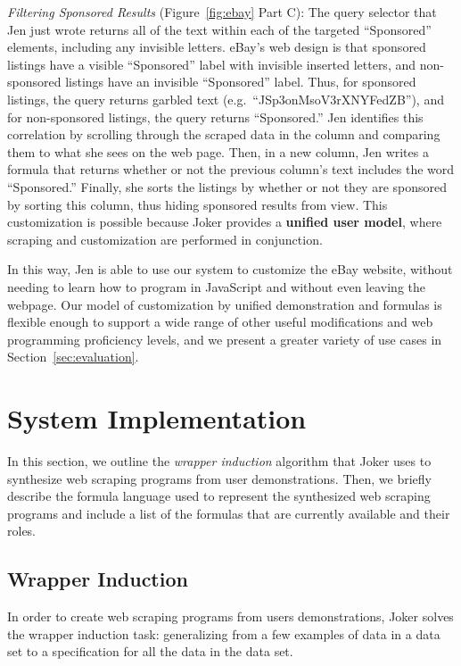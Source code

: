 \documentclass[sigconf,10pt]{acmart}
\begin{document}
\emph{Filtering Sponsored Results} (Figure~\ref{fig:ebay} Part C): The
query selector that Jen just wrote returns all of the text within each
of the targeted ``Sponsored'' elements, including any invisible letters.
eBay's web design is that sponsored listings have a visible
``Sponsored'' label with invisible inserted letters, and non-sponsored
listings have an invisible ``Sponsored'' label. Thus, for sponsored
listings, the query returns garbled text
(e.g.~``JSp3onMsoV3rXNYFedZB''), and for non-sponsored listings, the
query returns ``Sponsored.'' Jen identifies this correlation by
scrolling through the scraped data in the column and comparing them to
what she sees on the web page. Then, in a new column, Jen writes a
formula that returns whether or not the previous column's text includes
the word ``Sponsored.'' Finally, she sorts the listings by whether or
not they are sponsored by sorting this column, thus hiding sponsored
results from view. This customization is possible because Joker provides
a \textbf{unified user model}, where scraping and customization are
performed in conjunction.

In this way, Jen is able to use our system to customize the eBay
website, without needing to learn how to program in JavaScript and
without even leaving the webpage. Our model of customization by unified
demonstration and formulas is flexible enough to support a wide range of
other useful modifications and web programming proficiency levels, and
we present a greater variety of use cases in
Section~\ref{sec:evaluation}.

\hypertarget{sec:implementation}{%
\section{System Implementation}\label{sec:implementation}}

In this section, we outline the \emph{wrapper induction}
\citep{kushmerick2000} algorithm that Joker uses to synthesize web
scraping programs from user demonstrations. Then, we briefly describe
the formula language used to represent the synthesized web scraping
programs and include a list of the formulas that are currently available
and their roles.

\hypertarget{wrapper-induction}{%
\subsection{Wrapper Induction}\label{wrapper-induction}}

In order to create web scraping programs from users demonstrations,
Joker solves the wrapper induction \citep{kushmerick2000} task:
generalizing from a few examples of data in a data set to a
specification for all the data in the data set.
\end{document}
